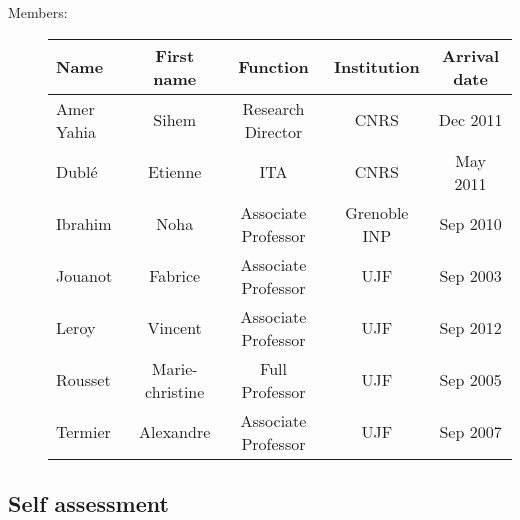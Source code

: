 \begin{description}

\item[Members:] 

\begin{center}\begin{tabular}{|p{2.5cm}|*{4}{c|}}
\hline 
Name & First name & Function & Institution & Arrival date\\\hline \hline %
Amer Yahia & Sihem & Research Director & CNRS & Dec 2011  \\\hline
Dubl{\'e} & Etienne & ITA  & CNRS & May 2011\\\hline
Ibrahim & Noha & Associate Professor & Grenoble INP & Sep 2010  \\\hline
Jouanot & Fabrice & Associate Professor & UJF & Sep 2003 \\\hline
Leroy & Vincent & Associate Professor & UJF & Sep 2012 \\\hline
Rousset & Marie-christine & Full Professor & UJF & Sep 2005 \\\hline
Termier & Alexandre & Associate Professor & UJF & Sep 2007 \\\hline
\hline
\end{tabular}\end{center}
\makeatother


\end{description}



\subsection{Self assessment} %
\label{sub:hadas_self_assesment}

